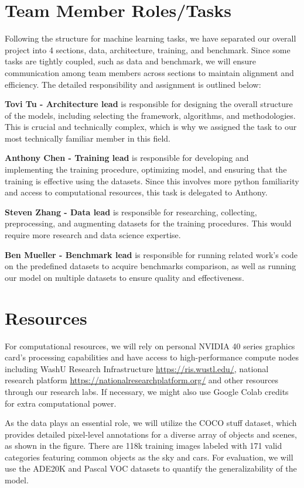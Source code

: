 \documentclass[10pt,twocolumn,letterpaper]{article}
\begin{document}
\section{Team Member Roles/Tasks}
\label{sec:roles}
Following the structure for machine learning tasks, we have separated our overall project into 4 sections, data, architecture, training, and benchmark. Since some tasks are tightly coupled, such as data and benchmark, we will ensure communication among team members across sections to maintain alignment and efficiency. The detailed responsibility and assignment is outlined below:

\textbf{Tovi Tu - Architecture lead} is responsible for designing the overall structure of the models, including selecting the framework, algorithms, and methodologies. This is crucial and technically complex, which is why we assigned the task to our most technically familiar member in this field.


\textbf{Anthony Chen - Training lead} is responsible for developing and implementing the training procedure, optimizing model, and ensuring that the training is effective using the datasets. Since this involves more python familiarity and access to computational resources, this task is delegated to Anthony.


\textbf{Steven Zhang - Data lead} is responsible for researching, collecting, preprocessing, and augmenting datasets for the training procedures. This would require more research and data science expertise. 


\textbf{Ben Mueller - Benchmark lead} is responsible for running related work’s code on the predefined datasets to acquire benchmarks comparison, as well as running our model on multiple datasets to ensure quality and effectiveness. 



\section{Resources}
For computational resources, we will rely on personal NVIDIA 40 series graphics card's processing capabilities and have access to high-performance compute nodes including WashU Research Infrastructure \url{https://ris.wustl.edu/}, national research platform \url{https://nationalresearchplatform.org/} and other resources through our research labs. If necessary, we might also use Google Colab credits for extra computational power.

As the data plays an essential role, we will utilize the COCO stuff dataset\cite{cocostuff}, which provides detailed pixel-level annotations for a diverse array of objects and scenes, as shown in the figure. There are 118k training images labeled with 171 valid categories featuring common objects as the sky and cars. For evaluation, we will use the ADE20K \cite{ade20k} and Pascal VOC \cite{pascal} datasets to quantify the generalizability of the model.
\end{document}
